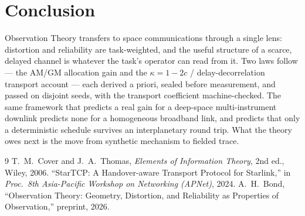 \documentclass[11pt]{article}
\theoremstyle{definition}
\theoremstyle{remark}
\begin{document}
\section{Conclusion}

Observation Theory transfers to space communications through a single
lens: distortion and reliability are task-weighted, and the useful
structure of a scarce, delayed channel is whatever the task's
operator can read from it. Two laws follow --- the AM/GM allocation gain
and the $\kappa=1-2c$ / delay-decorrelation transport account --- each
derived a priori, sealed before measurement, and passed on disjoint
seeds, with the transport coefficient machine-checked. The same framework
that predicts a real gain for a deep-space multi-instrument downlink
predicts none for a homogeneous broadband link, and predicts that only a
deterministic schedule survives an interplanetary round trip. What the
theory owes next is the move from synthetic mechanism to fielded trace.

\begin{thebibliography}{9}
 T.~M.~Cover and J.~A.~Thomas, \emph{Elements of
Information Theory}, 2nd ed., Wiley, 2006.
 ``StarTCP: A Handover-aware Transport Protocol for
Starlink,'' in \emph{Proc.\ 8th Asia-Pacific Workshop on Networking
(APNet)}, 2024.
 A.~H.~Bond, ``Observation Theory: Geometry,
Distortion, and Reliability as Properties of Observation,'' preprint,
2026.
\end{thebibliography}
\end{document}
